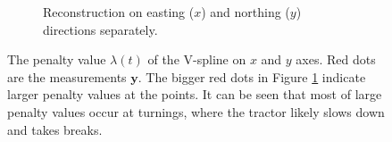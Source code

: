 \begin{figure}
\begin{subfigure}{\textwidth}
    \caption{Reconstruction on easting ($x$) and northing ($y$) directions separately.}\label{penaltyxyggXYPath}
    \end{subfigure}
 \caption{The penalty value $\lambda(t)$ of the V-spline on $x$ and $y$ axes. Red dots are the measurements $\mathbf{y}$. The bigger red dots in Figure \ref{penaltyxyggXYPath} indicate larger penalty values at the points. It can be seen that most of large penalty values occur at turnings, where the tractor likely slows down and takes breaks. }\label{penaltyxygg}
 \end{figure}

